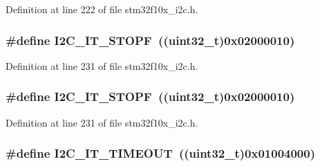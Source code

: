 Definition at line 222 of file stm32f10x\+\_\+i2c.\+h.

\subsubsection[{\texorpdfstring{I2\+C\+\_\+\+I\+T\+\_\+\+S\+T\+O\+PF}{I2C_IT_STOPF}}]{\setlength{\rightskip}{0pt plus 5cm}\#define I2\+C\+\_\+\+I\+T\+\_\+\+S\+T\+O\+PF~(({\bf uint32\+\_\+t})0x02000010)}\hypertarget{group___i2_c__interrupts__definition_ga741e098abb485b327c7668518117e415}{}\label{group___i2_c__interrupts__definition_ga741e098abb485b327c7668518117e415}


Definition at line 231 of file stm32f10x\+\_\+i2c.\+h.

\subsubsection[{\texorpdfstring{I2\+C\+\_\+\+I\+T\+\_\+\+S\+T\+O\+PF}{I2C_IT_STOPF}}]{\setlength{\rightskip}{0pt plus 5cm}\#define I2\+C\+\_\+\+I\+T\+\_\+\+S\+T\+O\+PF~(({\bf uint32\+\_\+t})0x02000010)}\hypertarget{group___i2_c__interrupts__definition_ga741e098abb485b327c7668518117e415}{}\label{group___i2_c__interrupts__definition_ga741e098abb485b327c7668518117e415}


Definition at line 231 of file stm32f10x\+\_\+i2c.\+h.

\subsubsection[{\texorpdfstring{I2\+C\+\_\+\+I\+T\+\_\+\+T\+I\+M\+E\+O\+UT}{I2C_IT_TIMEOUT}}]{\setlength{\rightskip}{0pt plus 5cm}\#define I2\+C\+\_\+\+I\+T\+\_\+\+T\+I\+M\+E\+O\+UT~(({\bf uint32\+\_\+t})0x01004000)}\hypertarget{group___i2_c__interrupts__definition_ga45ce34b163b456a5fb3833f1264d93b4}{}\label{group___i2_c__interrupts__definition_ga45ce34b163b456a5fb3833f1264d93b4}


